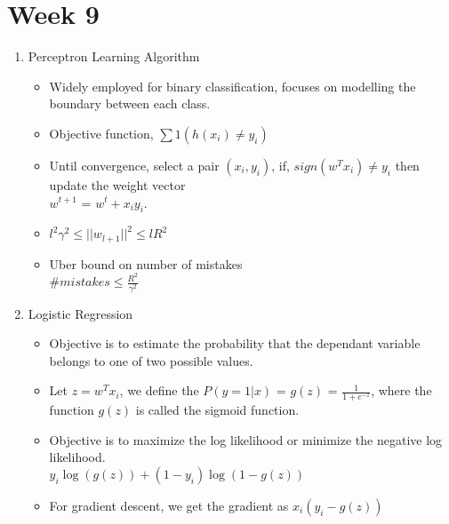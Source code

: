 \documentclass[a4paper]{article}
\begin{document}
\section{Week 9}
\begin{enumerate}
    \item Perceptron Learning Algorithm
    \begin{itemize}
        \item Widely employed for binary classification, focuses on modelling the boundary between each class.
        \item Objective function, $\sum 1(h(x_i)\neq y_i)$
        \item Until convergence, select a pair $(x_i,y_i)$, if, $sign(w^Tx_i)\neq y_i$ then update the weight vector\\
        $w^{t+1}$ = $w^t + x_iy_i$.
        \item $l^2\gamma^2\leq ||w_{l+1}||^2\leq lR^2$
        \item Uber bound on number of mistakes\\
        $\#mistakes \leq \frac{R^2}{\gamma^2}$
    \end{itemize}
    \item Logistic Regression
    \begin{itemize}
        \item Objective is to estimate the probability that the dependant variable belongs to one of two possible values.
        \item Let $z=w^Tx_i$, we define the $P(y=1|x)$ = $g(z)$ = $\frac{1}{1 + e^{-z}}$, where the function $g(z)$ is called the sigmoid function.
        \item Objective is to maximize the log likelihood or minimize the negative log likelihood.\\
        $y_i\log(g(z)) + (1-y_i)\log(1-g(z))$
        \item For gradient descent, we get the gradient as $x_i(y_i - g(z))$
    \end{itemize}
\end{enumerate}
\end{document}
